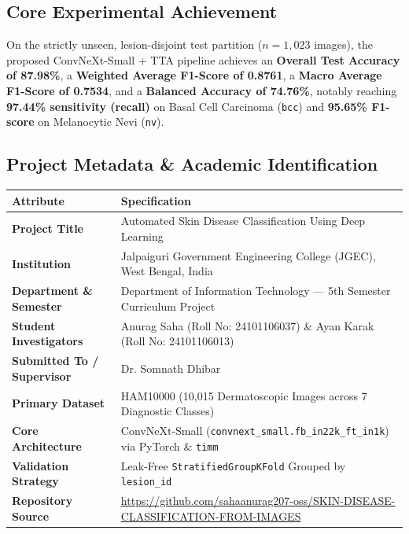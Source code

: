 \documentclass[12pt,a4paper]{article}
\begin{document}
\subsection*{Core Experimental Achievement}
On the strictly unseen, lesion-disjoint test partition ($n = 1,023$ images), the proposed ConvNeXt-Small + TTA pipeline achieves an \textbf{Overall Test Accuracy of 87.98\%}, a \textbf{Weighted Average F1-Score of 0.8761}, a \textbf{Macro Average F1-Score of 0.7534}, and a \textbf{Balanced Accuracy of 74.76\%}, notably reaching \textbf{97.44\% sensitivity (recall)} on Basal Cell Carcinoma (\texttt{bcc}) and \textbf{95.65\% F1-score} on Melanocytic Nevi (\texttt{nv}).

\subsection{Project Metadata \& Academic Identification}
\begin{table}[h!]
\centering
\renewcommand{\arraystretch}{1.25}
\begin{tabularx}{\textwidth}{>{\bfseries}l X}
\toprule
Attribute & Specification \\
\midrule
Project Title & Automated Skin Disease Classification Using Deep Learning \\
Institution & Jalpaiguri Government Engineering College (JGEC), West Bengal, India \\
Department \& Semester & Department of Information Technology --- 5th Semester Curriculum Project \\
Student Investigators & Anurag Saha (Roll No: 24101106037) \& Ayan Karak (Roll No: 24101106013) \\
Submitted To / Supervisor & Dr. Somnath Dhibar \\
Primary Dataset & HAM10000 (10,015 Dermatoscopic Images across 7 Diagnostic Classes) \\
Core Architecture & ConvNeXt-Small (\texttt{convnext\_small.fb\_in22k\_ft\_in1k}) via PyTorch \& \texttt{timm} \\
Validation Strategy & Leak-Free \texttt{StratifiedGroupKFold} Grouped by \texttt{lesion\_id} \\
Repository Source & \url{https://github.com/sahaanurag207-oss/SKIN-DISEASE-CLASSIFICATION-FROM-IMAGES} \\
\bottomrule
\end{tabularx}
\end{table}
\end{document}
